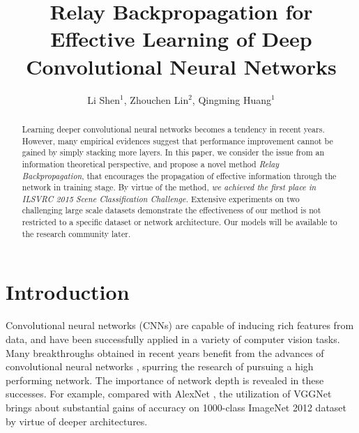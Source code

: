 \documentclass[runningheads]{llncs}
\begin{document}
\pagestyle{headings}
\mainmatter

\title{Relay Backpropagation for Effective Learning of Deep Convolutional Neural Networks} 

\titlerunning{ }

\authorrunning{ }

\author{Li Shen$^{1}$, Zhouchen Lin$^{2}$, Qingming Huang$^{1}$}


\maketitle

\begin{abstract}
Learning deeper convolutional neural networks becomes a tendency in recent years. However, many empirical evidences suggest that performance improvement cannot be gained by simply stacking more layers. In this paper, we consider the issue from an information theoretical perspective, and propose a novel method {\it Relay Backpropagation}, that encourages the propagation of  effective information through the network in training stage. By virtue of the method, {\it we achieved the first place in ILSVRC 2015 Scene Classification Challenge.} Extensive experiments on two challenging large scale datasets demonstrate the effectiveness of
our method is not restricted to a specific dataset or network architecture. Our models will be available to the research community later.

\end{abstract}


\section{Introduction}

Convolutional neural networks (CNNs) are capable of inducing rich features from data, and have been successfully applied in a variety of computer vision tasks. Many breakthroughs obtained in recent years benefit from the advances of convolutional neural networks \cite{krizhevsky_nips2012,girshick_cvpr2014,taigman_cvpr2014,karpathy_cvpr2014}, spurring the research of pursuing a high performing network. The importance of network depth is revealed in these successes. For example, compared with AlexNet \cite{krizhevsky_nips2012}, the utilization of VGGNet \cite{simonyan_iclr2015} brings about substantial gains of accuracy on 1000-class ImageNet 2012 dataset by virtue of deeper architectures.
\end{document}
